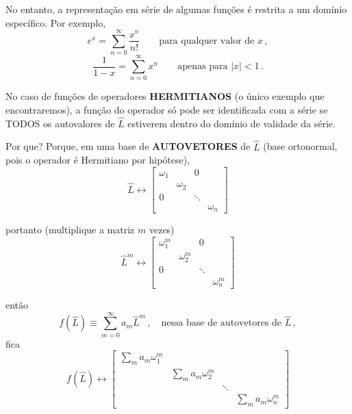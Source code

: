 No entanto, a representação em série de algumas funções é restrita a um domínio específico. Por exemplo,
\begin{equation}
    e^x = \sum_{n=0}^{\infty} \frac{x^n}{n!} \qquad \text{para qualquer valor de } x \, ,
\end{equation}
\begin{equation}
    \frac{1}{1-x} = \sum_{n=0}^{\infty} x^n \qquad \text{apenas para } |x| < 1 \, .
\end{equation}

No caso de funções de operadores \textbf{HERMITIANOS} (o único exemplo que encontraremos), a função do operador só pode ser identificada com a série se TODOS os autovalores de $\hat{L}$ estiverem dentro do domínio de validade da série.

Por que? Porque, em uma base de \textbf{AUTOVETORES} de $\hat{L}$ (base ortonormal, pois o operador é Hermitiano por hipótese),
\begin{equation}
    \hat{L} \leftrightarrow
    \begin{bmatrix}
        \omega_1 & & 0 \\
        & \omega_2 & \\
        0 & & \ddots \\
        & & & \omega_n
    \end{bmatrix}
\end{equation}

portanto (multiplique a matriz $m$ vezes)
\begin{equation}
    \hat{L}^m \leftrightarrow
    \begin{bmatrix}
        \omega_1^m & & 0 \\
        & \omega_2^m & \\
        0 & & \ddots \\
        & & & \omega_n^m
    \end{bmatrix}
\end{equation}

então
\begin{equation}
    \label{eq:aula6_serie_operador}
    f(\hat{L}) \equiv \sum_{m=0}^{\infty} a_m \hat{L}^m \, , \quad \text{nessa base de autovetores de } \hat{L} \, ,
\end{equation}
fica
\begin{equation}
    f(\hat{L}) \leftrightarrow
    \begin{bmatrix}
        \displaystyle\sum_m a_m \omega_1^m & & \\
        & \displaystyle\sum_m a_m \omega_2^m & \\
        & & \ddots \\
        & & & \displaystyle\sum_m a_m \omega_n^m
    \end{bmatrix}
\end{equation}

